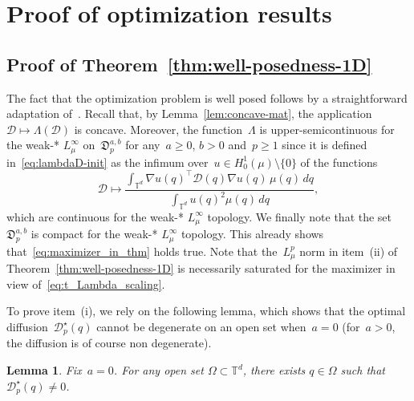 \documentclass{article}
\newtheorem{lemma}{Lemma}
\newcommand{\dps}{\displaystyle }
\renewcommand{\geq}{\geqslant}
\def\T{\mathbb{T}}
\newcommand{\Diff}{\mathcal{D}}
\newcommand{\Diffset}{\mathfrak{D}}
\renewcommand{\dim}{d}
\begin{document}

\appendix

\section{Proof of optimization results}

\subsection{Proof of Theorem~\ref{thm:well-posedness-1D}}
\label{app:thm:well-posedness-1D}

The fact that the optimization problem is well posed follows by a straightforward adaptation of~\cite[Theorem~10.3.1]{Henrot}. Recall that, by Lemma~\ref{lem:concave-mat}, the application $\Diff \mapsto\Lambda(\Diff)$ is concave. Moreover, the function~$\Lambda$ is upper-semicontinuous for the weak-* $L^\infty_\mu$ on~$\Diffset_p^{a,b}$ for any~$a \geq 0$, $b>0$ and~$p\geq 1$ since it is defined in~\eqref{eq:lambdaD-init} as the infimum over~$u \in H^1_0(\mu) \setminus\{0\}$ of the functions
\[
\Diff \mapsto \frac{\dps \int_{\T^\dim} \nabla u (q)^{\top}\Diff(q) \nabla u (q) \, \mu(q)\,dq}{\dps \int_{\T^\dim} u(q)^2 \mu(q)\,dq},
\]
which are continuous for the weak-* $L^\infty_\mu$ topology. We finally note that the set~$\Diffset_p^{a,b}$ is compact for the weak-* $L^\infty_\mu$ topology. This already shows that~\eqref{eq:maximizer_in_thm} holds true. Note that the~$L^p_\mu$ norm in item~(ii) of Theorem~\ref{thm:well-posedness-1D} is necessarily saturated for the maximizer in view of~\eqref{eq:t_Lambda_scaling}.

To prove item~(i), we rely on the following lemma, which shows that the optimal diffusion~$\Diff^{\star}_p(q)$ cannot be degenerate on an open set when~$a=0$ (for~$a>0$, the diffusion is of course non degenerate).

\begin{lemma}
  \label{lem:D-positive-on-open-set}
  Fix~$a=0$. For any open set $\Omega \subset \T^\dim$, there exists $q\in\Omega$ such that~$\Diff^{\star}_p(q)\neq 0$.
\end{lemma}
\end{document}
